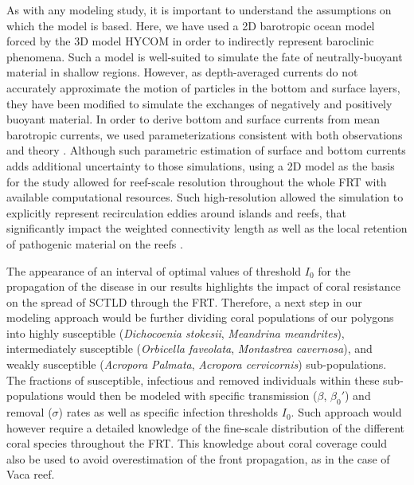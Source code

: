 As with any modeling study, it is important to understand the assumptions on which the model is based. Here, we have used a 2D barotropic ocean model forced by the 3D model HYCOM \citep{chassignet2007hycom} in order to indirectly represent baroclinic phenomena. Such a model is well-suited to simulate the fate of neutrally-buoyant material in shallow regions. However, as depth-averaged currents do not accurately approximate the motion of particles in the bottom and surface layers, they have been modified to simulate the exchanges of negatively and positively buoyant material. In order to derive bottom and surface currents from mean barotropic currents, we used parameterizations consistent with both observations and theory \citep{ardhuin2009observation,perlin2007organization, kundu1976ekman, smith2009influence}. Although such parametric estimation of surface and bottom currents adds additional uncertainty to those simulations, using a 2D model as the basis for the study allowed for reef-scale resolution throughout the whole FRT with available computational resources. Such high-resolution allowed the simulation to explicitly represent recirculation eddies around islands and reefs, that significantly impact the weighted connectivity length as well as the local retention of pathogenic material on the reefs \citep{frys2020fine}.

The appearance of an interval of optimal values of threshold $I_0$ for the propagation of the disease in our results highlights the impact of coral resistance on the spread of SCTLD through the FRT. Therefore, a next step in our modeling approach would be further dividing coral populations of our polygons into highly susceptible (\eg \textit{Dichocoenia stokesii}, \textit{Meandrina meandrites}), intermediately susceptible (\eg \textit{Orbicella faveolata}, \textit{Montastrea cavernosa}), and weakly susceptible (\eg \textit{Acropora Palmata}, \textit{Acropora cervicornis}) sub-populations. The fractions of susceptible, infectious and removed individuals within these sub-populations would then be modeled with specific transmission ($\beta$, $\beta_0'$) and removal ($\sigma$) rates as well as specific infection thresholds $I_0$. Such approach would however require a detailed knowledge of the fine-scale distribution of the different coral species throughout the FRT. This knowledge about coral coverage could also be used to avoid overestimation of the front propagation, as in the case of Vaca reef.


